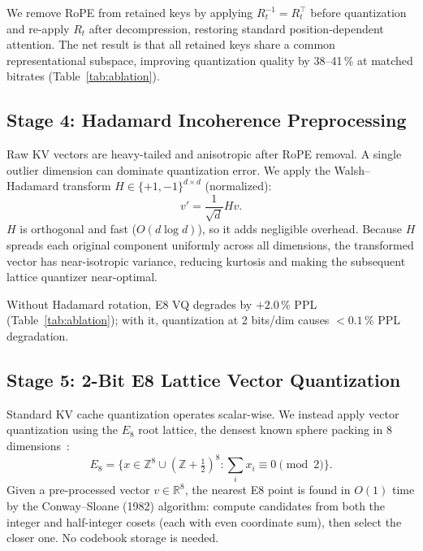 \documentclass{article}
\begin{document}
We remove RoPE from retained keys by applying $R_t^{-1} = R_t^\top$ before
quantization and re-apply $R_t$ after decompression, restoring standard
position-dependent attention. The net result is that all retained keys share a
common representational subspace, improving quantization quality by
38--41\,\% at matched bitrates (Table~\ref{tab:ablation}).

\subsection{Stage 4: Hadamard Incoherence Preprocessing}
\label{sec:hadamard}

Raw KV vectors are heavy-tailed and anisotropic after RoPE removal. A single
outlier dimension can dominate quantization error. We apply the Walsh--Hadamard
transform $H \in \{+1,-1\}^{d \times d}$ (normalized):
\begin{equation}
  v' = \frac{1}{\sqrt{d}} H v.
  \label{eq:hadamard}
\end{equation}
$H$ is orthogonal and fast ($O(d \log d)$), so it adds negligible overhead.
Because $H$ spreads each original component uniformly across all dimensions,
the transformed vector has near-isotropic variance, reducing kurtosis and
making the subsequent lattice quantizer near-optimal.

Without Hadamard rotation, E8 VQ degrades by $+2.0$\,\% PPL (Table~\ref{tab:ablation});
with it, quantization at 2 bits/dim causes $<0.1$\,\% PPL degradation.

\subsection{Stage 5: 2-Bit E8 Lattice Vector Quantization}
\label{sec:e8}

Standard KV cache quantization operates scalar-wise. We instead apply vector
quantization using the $E_8$ root lattice, the densest known sphere packing in
8 dimensions~\cite{viazovska2017}:
\begin{equation}
  E_8 = \bigl\{x \in \mathbb{Z}^8 \cup (\mathbb{Z}+\tfrac{1}{2})^8
         : \textstyle\sum_i x_i \equiv 0 \pmod{2}\bigr\}.
  \label{eq:e8}
\end{equation}
Given a pre-processed vector $v \in \mathbb{R}^8$, the nearest E8 point is found
in $O(1)$ time by the Conway--Sloane (1982) algorithm: compute candidates from
both the integer and half-integer cosets (each with even coordinate sum), then
select the closer one. No codebook storage is needed.
\end{document}

